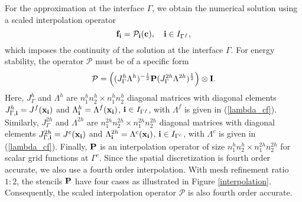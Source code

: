 {{For the approximation at the interface $\Gamma$, we obtain the numerical solution using a scaled interpolation operator
\begin{equation}\label{continuous_sol}
{\bf f}_{\bf i} = {\mathcal{P}}_{\bf i}({\bf c}),\quad {\bf i}\in I_{\Gamma^f},
\end{equation}
which imposes the continuity of the solution at the interface $\Gamma$. 
For energy stability, the operator ${\mathcal{P}}$ must be of a specific form
\begin{equation}\label{scaleP}
{\mathcal{P}} = \left(({J}^h_\Gamma {\Lambda}^h)^{-\frac{1}{2}}{\bf P}({J}^{2h}_\Gamma {\Lambda}^{2h})^{\frac{1}{2}}\right)\otimes{\bf I}.
\end{equation}
Here, $J_{\Gamma}^h$ and $\Lambda^h$ are $n_1^{h}n_2^{h}\times n_1^{h}n_2^{h}$ diagonal matrices with diagonal elements $J_{\Gamma,{\bf i}}^h = J^f({\bf x}_{\bf i})$ and $\Lambda_{\bf i}^h = \Lambda^f({\bf x_i})$, ${\bf i}\in I_{\Gamma^f}$, with $\Lambda^f$ is given in (\ref{lambda_cf}). Similarly, ${J}_{\Gamma}^{2h}$ and ${{\Lambda}^{2h}}$ are $n_1^{2h}n_2^{2h}\times n_1^{2h}n_2^{2h}$ diagonal matrices with diagonal elements $J_{\Gamma,{\bf i}}^{2h} = J^c({\bf x}_{\bf i})$ and $\Lambda_{\bf i}^{2h} = \Lambda^c({\bf x_i})$, ${\bf i}\in I_{\Gamma^c}$, with $\Lambda^c$ is given in (\ref{lambda_cf}). Finally, ${\bf P}$ is an interpolation operator of size $n_1^hn_2^h\times n_1^{2h}n_2^{2h}$ for scalar grid functions at $\Gamma^c$. Since the spatial discretization is fourth order accurate, we also use a fourth order interpolation. With mesh refinement ratio  $1:2$, the stencils ${\bf P}$ have four cases as illustrated in  Figure \ref{interpolation}. Consequently, the scaled interpolation operator $\mathcal{P}$ is also fourth order accurate.

}}
